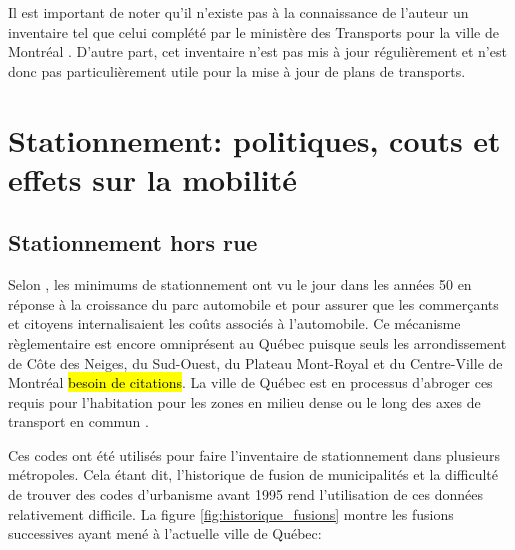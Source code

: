   Il est important de noter qu'il n'existe pas à la connaissance de l'auteur un inventaire tel que celui complété par le ministère des Transports pour la ville de Montréal \parencite{ConsortiumCIMA+-DanielArbouretassocies:InventaireEspaces:1998}. D'autre part, cet inventaire n'est pas mis à jour régulièrement et n'est donc pas particulièrement utile pour la mise à jour de plans de transports.
\section{Stationnement: politiques, couts et effets sur la mobilité}
  \subsection{Stationnement hors rue}
  Selon \textcite{Shoup:HighCost:2005}, les minimums de stationnement ont vu le jour dans les années 50 en réponse à la croissance du parc automobile et pour assurer que les commerçants et citoyens internalisaient les coûts associés à l'automobile. Ce mécanisme règlementaire est encore omniprésent au Québec puisque seuls les arrondissement de Côte des Neiges, du Sud-Ouest, du Plateau Mont-Royal et du Centre-Ville de Montréal \hl{besoin de citations}. La ville de Québec est en processus d'abroger ces requis pour l'habitation pour les zones en milieu dense ou le long des axes de transport en commun \parencite{VilledeQuebec:AdoptionReglement:2024}.\par
  Ces codes ont été utilisés pour faire l'inventaire de stationnement dans plusieurs métropoles. Cela étant dit, l'historique de fusion de municipalités et la difficulté de trouver des codes d'urbanisme avant 1995 rend l'utilisation de ces données relativement difficile. La figure \ref{fig:historique_fusions} montre les fusions successives ayant mené à l'actuelle ville de Québec:
